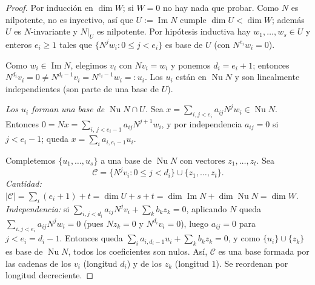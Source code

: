\documentclass{article}
\DeclareMathOperator{\Ima}{Im}
\DeclareMathOperator{\Nu}{Nu}
\theoremstyle{plain}
\theoremstyle{definition}
\theoremstyle{remark}
\begin{document}
\begin{proof}
    Por inducción en \(\dim W\); si \(W=0\) no hay nada que probar. Como \(N\) es nilpotente, no es inyectivo, así que \(U:=\Ima N\) cumple \(\dim U<\dim W\); además \(U\) es \(N\)-invariante y \(N|_U\) es nilpotente. Por hipótesis inductiva hay \(w_1,\dots,w_s\in U\) y enteros \(e_i\ge1\) tales que \(\{N^jw_i:0\le j<e_i\}\) es base de \(U\) (con \(N^{e_i}w_i=0\)).

    Como \(w_i\in\Ima N\), elegimos \(v_i\) con \(Nv_i=w_i\) y ponemos \(d_i=e_i+1\); entonces \(N^{d_i}v_i=0\ne N^{d_i-1}v_i=N^{e_i-1}w_i=:u_i\). Los \(u_i\) están en \(\Nu N\) y son linealmente independientes (son parte de una base de \(U\)).

    \emph{Los \(u_i\) forman una base de \(\Nu N\cap U\).} Sea \(x=\sum_{i,j<e_i}a_{ij}N^jw_i\in\Nu N\). Entonces \(0=Nx=\sum_{i,\,j<e_i-1}a_{ij}N^{j+1}w_i\), y por independencia \(a_{ij}=0\) si \(j<e_i-1\); queda \(x=\sum_ia_{i,e_i-1}u_i\).

    Completemos \(\{u_1,\dots,u_s\}\) a una base de \(\Nu N\) con vectores \(z_1,\dots,z_t\). Sea
    \[
        \mathcal C=\{N^jv_i:0\le j<d_i\}\cup\{z_1,\dots,z_t\}.
    \]
    \emph{Cantidad:} \(|\mathcal C|=\sum_i(e_i+1)+t=\dim U+s+t=\dim\Ima N+\dim\Nu N=\dim W\).
    \emph{Independencia:} si \(\sum_{i,j<d_i}a_{ij}N^jv_i+\sum_kb_kz_k=0\), aplicando \(N\) queda \(\sum_{i,j<e_i}a_{ij}N^jw_i=0\) (pues \(Nz_k=0\) y \(N^{d_i}v_i=0\)), luego \(a_{ij}=0\) para \(j<e_i=d_i-1\). Entonces queda \(\sum_ia_{i,d_i-1}u_i+\sum_kb_kz_k=0\), y como \(\{u_i\}\cup\{z_k\}\) es base de \(\Nu N\), todos los coeficientes son nulos.
    Así, \(\mathcal C\) es una base formada por las cadenas de los \(v_i\) (longitud \(d_i\)) y de los \(z_k\) (longitud \(1\)). Se reordenan por longitud decreciente.
\end{proof}
\end{document}
